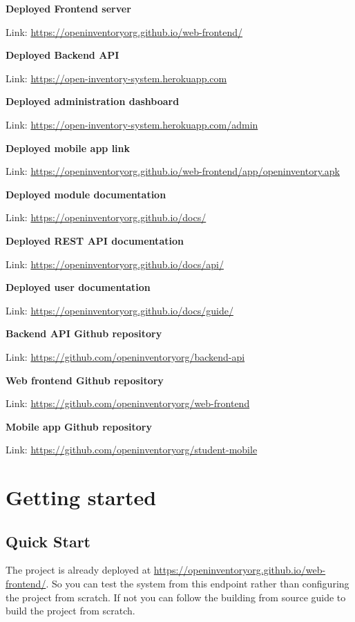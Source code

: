 \documentclass[12pt,a4paper]{article}
\begin{document}
\noindent \textbf{Deployed Frontend server} \par
Link: \url{https://openinventoryorg.github.io/web-frontend/}  \par
\noindent \textbf{Deployed Backend API} \par
Link: \url{https://open-inventory-system.herokuapp.com}  \par
\noindent \textbf{Deployed administration dashboard} \par
Link: \url{https://open-inventory-system.herokuapp.com/admin}  \par
\noindent \textbf{Deployed mobile app link} \par
Link: \url{https://openinventoryorg.github.io/web-frontend/app/openinventory.apk}  \par
\noindent \textbf{Deployed module documentation} \par
Link: \url{https://openinventoryorg.github.io/docs/}  \par
\noindent \textbf{Deployed REST API documentation} \par
Link: \url{https://openinventoryorg.github.io/docs/api/}  \par
\noindent \textbf{Deployed user documentation} \par
Link: \url{https://openinventoryorg.github.io/docs/guide/}  \par
\noindent \textbf{Backend API Github repository} \par
Link: \url{https://github.com/openinventoryorg/backend-api}  \par
\noindent \textbf{Web frontend Github repository} \par
Link: \url{https://github.com/openinventoryorg/web-frontend}  \par
\noindent \textbf{Mobile app Github repository} \par
Link: \url{https://github.com/openinventoryorg/student-mobile}  \par

\newpage
\section{Getting started}

\subsection{Quick Start}

The project is already deployed at \url{https://openinventoryorg.github.io/web-frontend/}. So you can test the system from this endpoint rather than configuring the project from scratch. If not you can follow the building from source guide to build the project from scratch.
\end{document}
